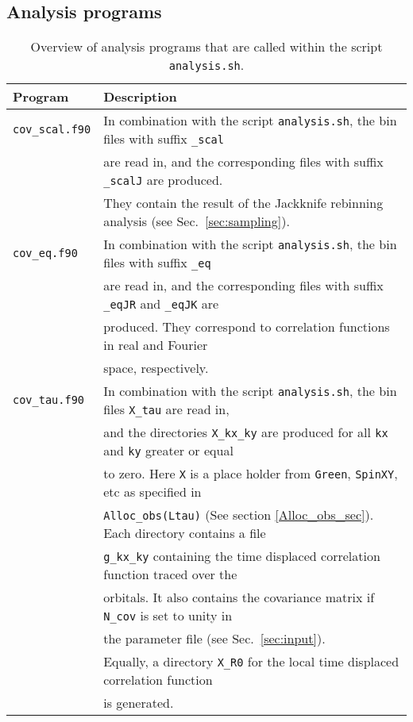 \documentclass{SciPost}
\begin{document}
\subsection{Analysis programs }\label{sec:analysis}
%
\begin{table}[h]
  \begin{tabular}{@{} l l @{}}\toprule
   Program & Description \\\midrule
   \texttt{cov\_scal.f90}  &  In combination with the script \texttt{analysis.sh}, the bin files with suffix \texttt{\_scal}\\
                           & are read in, and  the corresponding files with suffix \texttt{\_scalJ} are produced.\\
                           & They  contain the  result of the Jackknife rebinning analysis  (see Sec.~\ref{sec:sampling}).  \\
   \texttt{cov\_eq.f90}    &  In combination with the script \texttt{analysis.sh}, the bin files with suffix \texttt{\_eq}\\
                           & are read in, and the corresponding files with suffix  \texttt{\_eqJR}  and  \texttt{\_eqJK}  are\\
                           & produced. They  correspond  to correlation functions in real and Fourier\\
                           & space, respectively.  \\
   \texttt{cov\_tau.f90}   &  In combination with the script \texttt{analysis.sh}, the bin files  \texttt{X\_tau} are read in, \\
                           & and the directories  \texttt{X\_kx\_ky} are produced  for all \texttt{kx} and \texttt{ky} greater or equal\\
                           & to zero. Here \texttt{X}  is a place holder from \texttt{Green}, \texttt{SpinXY}, etc   as specified in\\
                           & \texttt{Alloc\_obs(Ltau)} (See section \ref{Alloc_obs_sec}). Each directory contains  a  file\\
                           & \texttt{g\_kx\_ky}  containing the  time displaced correlation function traced over the\\
                           & orbitals. It also contains the   covariance matrix if \texttt{N\_cov} is set to unity in\\
                           & the parameter file (see Sec.~\ref{sec:input}). \\
                           & Equally, a directory  \texttt{X\_R0}  for the local  time displaced  correlation function\\
                           & is generated. \\\bottomrule
   \end{tabular}
   \caption{ Overview of analysis programs that are called within the script \texttt{analysis.sh}. \label{table:analysis_programs}}
\end{table}
\end{document}
